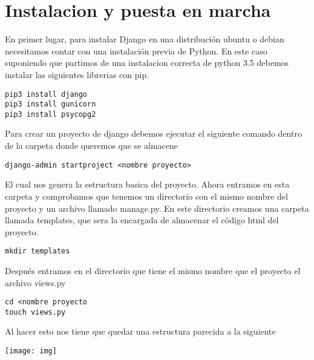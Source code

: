 \section{Instalacion y puesta en marcha}

En primer lugar, para instalar Django en una distribución ubuntu o debian necesitamos contar
con una instalación previa de Python. En este caso suponiendo que partimos de una instalacion
correcta de python 3.5 debemos instalar las siguientes librerias con pip.


\lstset{
  language=Bash,
}
\begin{lstlisting}
pip3 install django
pip3 install gunicorn
pip3 install psycopg2
\end{lstlisting}

Para crear un proyecto de django debemos ejecutar el siguiente comando dentro de la carpeta
donde queremos que se almacene

\begin{lstlisting}
django-admin startproject <nombre proyecto>
\end{lstlisting}

El cual nos genera la estructura basica del proyecto. Ahora entramos en esta carpeta y comprobamos 
que tenemos un directorio con el mismo nombre del proyecto y un archivo llamado manage.py. En este
directorio creamos una carpeta llamada templates, que sera la encargada de almacenar el código html
del proyecto.

\begin{lstlisting}
mkdir templates
\end{lstlisting}

Después entramos en el directorio que tiene el mismo nombre que el proyecto el archivo views.py

\begin{lstlisting}
cd <nombre proyecto
touch views.py
\end{lstlisting}

Al hacer esto nos tiene que quedar una estructura parecida a la siguiente

\begin{center}
\texttt{[image: img]}
\label{fig:Estructura Proyecto}
\end{center}


